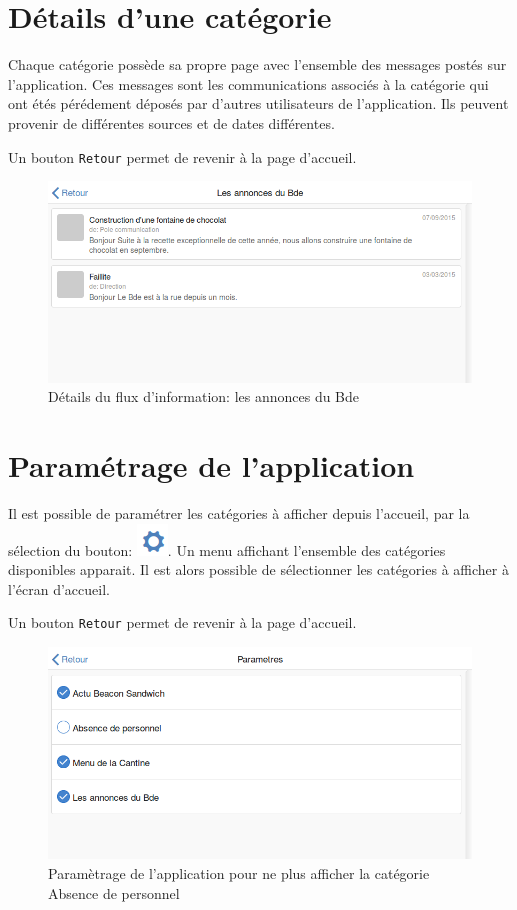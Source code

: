 \documentclass{report}
\begin{document}
\section{Détails d'une catégorie}

Chaque catégorie possède sa propre page avec l'ensemble des messages postés sur l'application. Ces messages sont les communications associés à la catégorie qui ont étés pérédement déposés par d'autres utilisateurs de l'application. Ils peuvent provenir de différentes sources et de dates différentes. 

Un bouton \texttt{Retour} permet de revenir à la page d'accueil.

\begin{figure}[h]
	\centering
	\includegraphics[scale=0.28]{details.png}
	\caption{Détails du flux d'information: \og les annonces du Bde \fg}
\end{figure}

\section{Paramétrage de l'application}

Il est possible de paramétrer les catégories à afficher depuis l'accueil, par la sélection du bouton: \includegraphics[scale=0.4]{boutonParam.png}. Un menu affichant l'ensemble des catégories disponibles apparait. Il est alors possible de sélectionner les catégories à afficher à l'écran d'accueil.

Un bouton \texttt{Retour} permet de revenir à la page d'accueil.


\begin{figure}[h]
	\centering
	\includegraphics[scale=0.28]{parametres.png}
	\caption{Paramètrage de l'application pour ne plus afficher la catégorie \og Absence de personnel \fg}
\end{figure}
\end{document}

